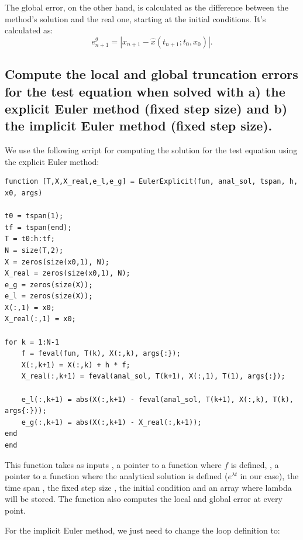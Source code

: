 The global error, on the other hand, is calculated as the difference between the method's solution and the real one, starting at the initial conditions. It's calculated as:
\begin{equation*}
    e_{n+1}^{g} = \left| x_{n+1} - \hat{x}(t_{n+1};t_0,x_0) \right |.
\end{equation*}


\subsection{Compute the local and global truncation errors for the test equation when
solved with a) the explicit Euler method (fixed step size) and b) the implicit Euler method (fixed step size).}

We use the following script for computing the solution for the test equation using the explicit Euler method:

\begin{lstlisting}[caption = Explicit Euler Method Solver, captionpos=b, label=1_ExEuler]
function [T,X,X_real,e_l,e_g] = EulerExplicit(fun, anal_sol, tspan, h, x0, args)

t0 = tspan(1);
tf = tspan(end);
T = t0:h:tf;
N = size(T,2);
X = zeros(size(x0,1), N);
X_real = zeros(size(x0,1), N);
e_g = zeros(size(X));
e_l = zeros(size(X));
X(:,1) = x0;
X_real(:,1) = x0;

for k = 1:N-1
    f = feval(fun, T(k), X(:,k), args{:});
    X(:,k+1) = X(:,k) + h * f;
    X_real(:,k+1) = feval(anal_sol, T(k+1), X(:,1), T(1), args{:});
    
    e_l(:,k+1) = abs(X(:,k+1) - feval(anal_sol, T(k+1), X(:,k), T(k), args{:}));
    e_g(:,k+1) = abs(X(:,k+1) - X_real(:,k+1));
end
end
\end{lstlisting}

This function takes as inputs , a pointer to a function where $f$ is defined, , a pointer to a function where the analytical solution is defined ($ e^{\lambda t} $ in our case), the time span , the fixed step size , the initial condition  and an array  where lambda will be stored. The function also computes the local and global error at every point.

For the implicit Euler method, we just need to change the loop definition to:

